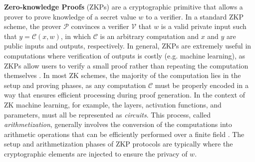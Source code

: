 
\textbf{Zero-knowledge Proofs}
(ZKPs) are a cryptographic primitive that allows a prover to prove knowledge of a secret value $w$ to a verifier. In a standard ZKP scheme, the prover $\mathcal{P}$ convinces a verifier $\mathcal{V}$ that $w$ is a valid private input such that $y=\mathcal{C}(x, w)$, in which $\mathcal{C}$ is an arbitrary computation and $x$ and $y$ are public inputs and outputs, respectively.
In general, ZKPs are extremely useful in computations where verification of outputs is costly (e.g. machine learning), as ZKPs allow users to verify a small proof rather than repeating the computation themselves \cite{xing2023zero}. In most ZK schemes, the majority of the computation lies in the setup and proving phases, as any computation $\mathcal{C}$ must be properly encoded in a way that ensures efficient processing during proof generation. In the context of ZK machine learning, for example, the layers, activation functions, and parameters, must all be represented as \textit{circuits}. This process, called \textit{arithmetization}, generally involves the conversion of the computations into arithmetic operations that can be efficiently performed over a finite field \cite{mouris2021zilch}. The setup and arithmetization phases of ZKP protocols are typically where the cryptographic elements are injected to ensure the privacy of $w$.

